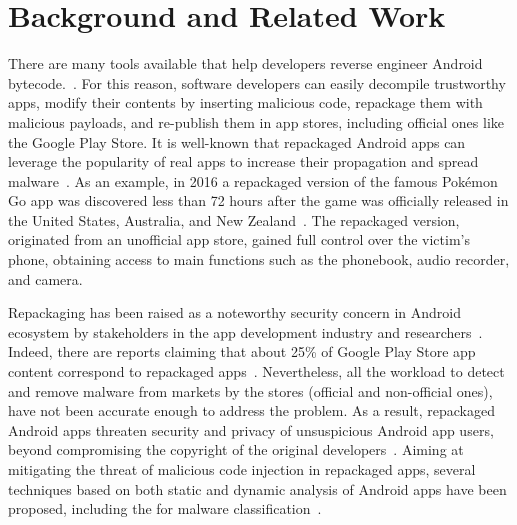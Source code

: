 \section{Background and Related Work}\label{sec:background}


There are many tools available that help developers reverse engineer Android bytecode.~\cite{DBLP:conf/issta/WangGMC15}.
For this reason, software developers can easily decompile trustworthy apps, modify their contents by inserting malicious code,
repackage them with malicious payloads, and re-publish them in app stores, including official ones like the Google Play Store.
It is well-known that repackaged Android apps can leverage the popularity of real apps to increase their propagation and spread malware~\cite{DBLP:journals/tse/LiBK21}. As an example, in 2016 a repackaged version of the famous Pokémon Go app was discovered less than 72 hours after the game was officially released in the United States, Australia, and New Zealand~\cite{DBLP:journals/tse/LiBK21}. The repackaged version, originated from an unofficial app store, gained full control over the victim's phone, obtaining access to main functions such as the phonebook, audio recorder, and camera.

Repackaging has been raised as a noteworthy security concern in Android ecosystem by stakeholders in the app development industry and researchers~\cite{DBLP:journals/ese/KhanmohammadiEH19}. Indeed, there are reports claiming that about 25\% of Google Play Store app content correspond to repackaged apps~\cite{DBLP:conf/sigmetrics/ViennotGN14}. Nevertheless, all the workload to detect and remove malware from markets by the stores (official and non-official ones), have not been accurate enough to address the problem. As a result, repackaged Android apps threaten security and privacy of unsuspicious Android app users, beyond compromising the copyright of the original developers~\cite{DBLP:journals/access/KimLCP19}. Aiming at
mitigating the threat of malicious code injection in repackaged apps,
several techniques based on both static and dynamic analysis of Android apps have been proposed,
including the \mas for malware classification~\cite{DBLP:conf/icse/JamrozikSZ16,DBLP:conf/wcre/BaoLL18}. 





